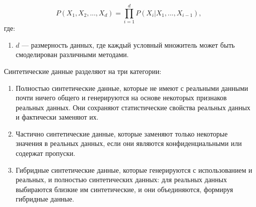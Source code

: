 \begin{equation}\label{eq:sint2}
    P(X_1, X_2, ..., X_d) = \prod_{i=1}^{d} P(X_i | X_1, ..., X_{i-1}),
\end{equation}
где:
\begin{enumerate}[label*=---]
	\item $d$ --- размерность данных, где каждый условный множитель может быть смоделирован различными методами.
\end{enumerate}
Синтетические данные разделяют на три категории:
\begin{enumerate}[label*=---]
	\item Полностью синтетические данные, которые не имеют с реальными
	данными почти ничего общего и генерируются на основе некоторых признаков
	реальных данных. Они сохраняют статистические свойства реальных данных и
	фактически заменяют их.~\cite{t, sin2}
	\item Частично синтетические данные, которые заменяют только
	некоторые значения в реальных данных, если они являются конфиденциальными
	или содержат пропуски.~\cite{t, sin2}
	\item Гибридные синтетические данные, которые генерируются с
	использованием и реальных, и полностью синтетических данных: для реальных
	данных выбираются близкие им синтетические, и они объединяются, формируя
	гибридные данные.~\cite{t, sin2}
\end{enumerate}





